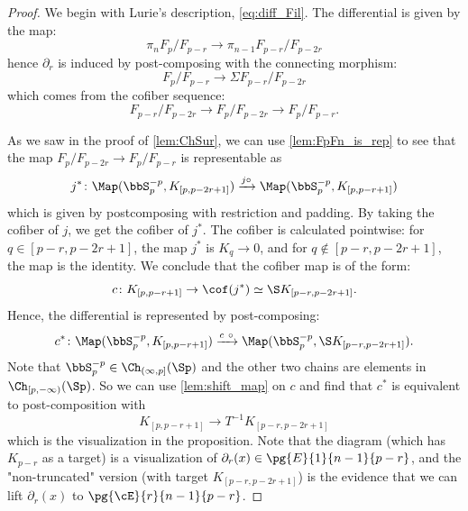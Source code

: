 \begin{proof}
    We begin with Lurie's description, \cref{eq:diff_Fil}. The differential is given by the map:
    \begin{equation}
        \pi_n F_p/F_{p-r} \to \pi_{n-1} F_{p-r}/F_{p-2r}
    \end{equation}
    hence $\partial_r$ is induced by post-composing with the connecting morphism:
    \begin{equation*}
        F_p/F_{p-r} \to \Sigma F_{p-r}/F_{p-2r}
    \end{equation*}
    which comes from the cofiber sequence:
    \begin{equation*}
        F_{p-r}/F_{p-2r} \to F_p/F_{p-2r} \to F_p/F_{p-r}.
    \end{equation*}

    As we saw in the proof of \cref{lem:ChSur}, we can use \cref{lem:FpFn_is_rep} to see that the map $F_p/F_{p-2r} \to F_p/F_{p-r}$ is representable as
    \begin{equation*}
        j^* \colon \Map(\bbS^{-p}_p, K_{[p,p-2r+1]}) \xrightarrow{j \circ } \Map(\bbS^{-p}_p, K_{[p,p-r+1]})
    \end{equation*}
    which is given by postcomposing with restriction and padding. By taking the cofiber of $j$, we get the cofiber of $j^*$. The cofiber is calculated pointwise: for $q \in [p-r,p-2r+1]$, the map $j^*$ is $K_q \to 0$, and for $q \notin [p-r,p-2r+1]$, the map is the identity. We conclude that the cofiber map is of the form:
    \begin{equation*}
        c \colon K_{[p,p-r+1]} \to \cof(j^*) \simeq \S K_{[p-r,p-2r+1]}.
    \end{equation*}
    Hence, the differential is represented by post-composing:
    \begin{equation*}
        c^* \colon \Map(\bbS^{-p}_p, K_{[p,p-r+1]}) \xrightarrow{c \ \circ } \Map(\bbS^{-p}_p, \S K_{[p-r,p-2r+1]}).
    \end{equation*}
    Note that $\bbS^{-p}_p \in \Ch_{(\infty,p]}(\Sp)$ and the other two chains are elements in $\Ch_{[p,-\infty)}(\Sp)$. So we can use \cref{lem:shift_map} on $c$ and find that $c^*$ is equivalent to post-composition with 
    \begin{equation*}
        K_{[p,p-r+1]} \to T^{-1} K_{[p-r,p-2r+1]}
    \end{equation*}
    which is the visualization in the proposition.
    Note that the diagram (which has $K_{p-r}$ as a target) is a visualization of $\partial_r(x) \in \pg{E}{1}{n-1}{p-r}$, and the "non-truncated" version (with target $K_{[p-r,p-2r+1]}$) is the evidence that we can lift $\partial_r(x)$ to $\pg{\cE}{r}{n-1}{p-r}$.
    

\end{proof}

